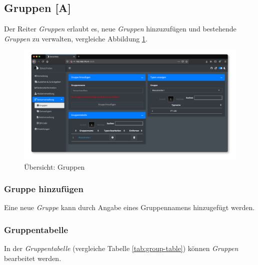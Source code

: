 \documentclass[
]{article}
\begin{document}
\hypertarget{group}{%
\subsection{Gruppen {[}A{]}}\label{group}}

Der Reiter \emph{Gruppen} erlaubt es, neue \emph{Gruppen} hinzuzufügen und bestehende \emph{Gruppen} zu verwalten, vergleiche Abbildung \ref{fig:group-overview}.

\begin{figure}
\centering
\includegraphics{./img/group_overview.png}
\caption{\label{fig:group-overview}Übersicht: Gruppen}
\end{figure}

\hypertarget{gruppe-hinzufuxfcgen}{%
\subsubsection{Gruppe hinzufügen}\label{gruppe-hinzufuxfcgen}}

Eine neue \emph{Gruppe} kann durch Angabe eines Gruppennamens hinzugefügt werden.

\hypertarget{gruppentabelle}{%
\subsubsection{Gruppentabelle}\label{gruppentabelle}}

In der \emph{Gruppentabelle} (vergleiche Tabelle \ref{tab:group-table}) können \emph{Gruppen} bearbeitet werden.
\end{document}
